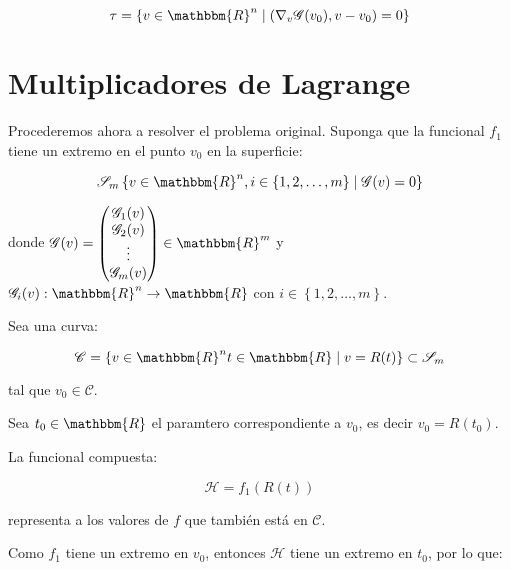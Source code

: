         \begin{equation}
            \tau = \left\{ v \in \mathbbm{R}^n \mid \left( \nabla_v \mathscr{G}(v_0), v - v_0 \right) = 0 \right\}
        \end{equation}

        \newpage
        \section{Multiplicadores de Lagrange}

        Procederemos ahora a resolver el problema original. Suponga que la funcional $f_1$ tiene un extremo en el punto $v_0$ en la superficie:

        \begin{equation}
            \mathscr{S}_m \left\{ v \in \mathbbm{R}^n, i \in \left\{ 1, 2, \dots, m \right\} \mid \mathscr{G}(v) = 0 \right\}
        \end{equation}

        donde $\mathscr{G}(v) = \begin{pmatrix} \mathscr{G}_1(v) \\ \mathscr{G}_2(v) \\ \vdots \\ \mathscr{G}_m(v) \end{pmatrix} \in \mathbbm{R}^m$
            y $\mathscr{G}_i(v):\mathbbm{R}^n \to \mathbbm{R}$
            con $i \in \left\{ 1,2,\dots,m \right\}$.

        Sea una curva:

        \begin{equation}
            \mathscr{C} = \left\{ v\in \mathbbm{R}^n t \in \mathbbm{R} \mid v = R(t) \right\} \subset \mathscr{S}_m
        \end{equation}

        tal que $v_0 \in \mathscr{C}$.

        Sea $t_0 \in \mathbbm{R}$ el paramtero correspondiente a $v_0$, es decir $v_0 = R(t_0)$.

        La funcional compuesta:

        \begin{equation}
            \mathscr{H} = f_1(R(t))
        \end{equation}

        representa a los valores de $f$  que también está en $\mathscr{C}$.

        Como $f_1$ tiene un extremo en $v_0$, entonces $\mathscr{H}$ tiene un extremo en $t_0$, por lo que:

